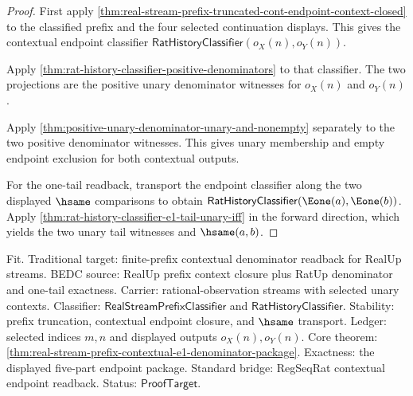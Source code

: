 \begin{proof}
First apply
\autoref{thm:real-stream-prefix-truncated-cont-endpoint-context-closed} to the
classified prefix and the four selected continuation displays. This gives the
contextual endpoint classifier
$\mathsf{RatHistoryClassifier}(o_X(n),o_Y(n))$.

Apply \autoref{thm:rat-history-classifier-positive-denominators} to that
classifier. The two projections are the positive unary denominator witnesses for
$o_X(n)$ and $o_Y(n)$.

Apply \autoref{thm:positive-unary-denominator-unary-and-nonempty} separately to
the two positive denominator witnesses. This gives unary membership and empty
endpoint exclusion for both contextual outputs.

For the one-tail readback, transport the endpoint classifier along the two
displayed $\hsame$ comparisons to obtain
$\mathsf{RatHistoryClassifier}(\Eone(a),\Eone(b))$. Apply
\autoref{thm:rat-history-classifier-e1-tail-unary-iff} in the forward direction,
which yields the two unary tail witnesses and $\hsame(a,b)$.
\end{proof}

Fit. Traditional target: finite-prefix contextual denominator readback for
RealUp streams. BEDC source: RealUp prefix context closure plus RatUp
denominator and one-tail exactness. Carrier: rational-observation streams with
selected unary contexts. Classifier: $\mathsf{RealStreamPrefixClassifier}$ and
$\mathsf{RatHistoryClassifier}$. Stability: prefix truncation, contextual
endpoint closure, and $\hsame$ transport. Ledger: selected indices $m,n$ and
displayed outputs $o_X(n),o_Y(n)$. Core theorem:
\autoref{thm:real-stream-prefix-contextual-e1-denominator-package}. Exactness:
the displayed five-part endpoint package. Standard bridge: RegSeqRat contextual
endpoint readback. Status: $\mathsf{ProofTarget}$.

